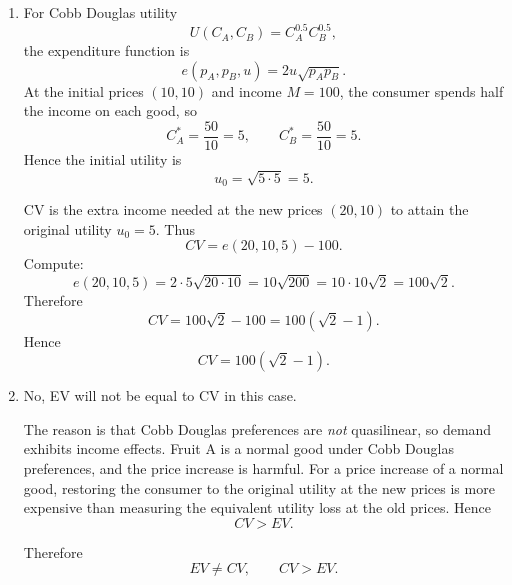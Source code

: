\documentclass[12pt]{article}
\begin{document}
\begin{enumerate}[label=(\alph*)]
\begin{center}
\end{center}

These diagrams show the standard Hicksian welfare interpretation:
\[
\text{CV} = e(p_A',p_B,u_0)-e(p_A,p_B,u_0),
\qquad
\text{EV} = e(p_A,p_B,u_0)-e(p_A,p_B,u_1).
\]

\newpage
    \item
    For Cobb Douglas utility
    \[
    U(C_A,C_B)=C_A^{0.5}C_B^{0.5},
    \]
    the expenditure function is
    \[
    e(p_A,p_B,u)=2u\sqrt{p_Ap_B}.
    \]
    At the initial prices \((10,10)\) and income \(M=100\), the consumer spends half the income on each good, so
    \[
    C_A^*=\frac{50}{10}=5,
    \qquad
    C_B^*=\frac{50}{10}=5.
    \]
    Hence the initial utility is
    \[
    u_0=\sqrt{5\cdot 5}=5.
    \]

    CV is the extra income needed at the new prices \((20,10)\) to attain the original utility \(u_0=5\). Thus
    \[
    CV=e(20,10,5)-100.
    \]
    Compute:
    \[
    e(20,10,5)=2\cdot 5\sqrt{20\cdot 10}
    =10\sqrt{200}
    =10\cdot 10\sqrt{2}
    =100\sqrt{2}.
    \]
    Therefore
    \[
    CV=100\sqrt{2}-100=100(\sqrt{2}-1).
    \]
    Hence
    \[
    \boxed{CV=100(\sqrt{2}-1).}
    \]

    \item
    No, EV will not be equal to CV in this case.

    The reason is that Cobb Douglas preferences are \emph{not} quasilinear, so demand exhibits income effects. Fruit A is a normal good under Cobb Douglas preferences, and the price increase is harmful. For a price increase of a normal good, restoring the consumer to the original utility at the new prices is more expensive than measuring the equivalent utility loss at the old prices. Hence
    \[
    CV>EV.
    \]

    Therefore
    \[
    \boxed{EV\neq CV,\qquad CV>EV.}
    \]
\end{enumerate}
\end{document}
